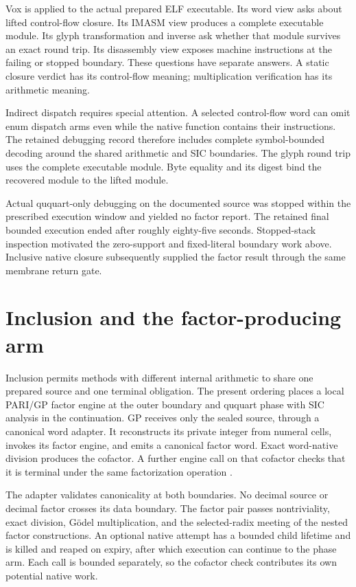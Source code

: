 \documentclass[12pt]{article}
\begin{document}
Vox is applied to the actual prepared ELF executable. Its word view asks about lifted control-flow closure. Its IMASM view produces a complete executable module. Its glyph transformation and inverse ask whether that module survives an exact round trip. Its disassembly view exposes machine instructions at the failing or stopped boundary. These questions have separate answers. A static closure verdict has its control-flow meaning; multiplication verification has its arithmetic meaning.

Indirect dispatch requires special attention. A selected control-flow word can omit enum dispatch arms even while the native function contains their instructions. The retained debugging record therefore includes complete symbol-bounded decoding around the shared arithmetic and SIC boundaries. The glyph round trip uses the complete executable module. Byte equality and its digest bind the recovered module to the lifted module.

Actual ququart-only debugging on the documented source was stopped within the prescribed execution window and yielded no factor report. The retained final bounded execution ended after roughly eighty-five seconds. Stopped-stack inspection motivated the zero-support and fixed-literal boundary work above. Inclusive native closure subsequently supplied the factor result through the same membrane return gate.

\section*{Inclusion and the factor-producing arm}

Inclusion permits methods with different internal arithmetic to share one prepared source and one terminal obligation. The present ordering places a local PARI/GP factor engine at the outer boundary and ququart phase with SIC analysis in the continuation. GP receives only the sealed source, through a canonical word adapter. It reconstructs its private integer from numeral cells, invokes its factor engine, and emits a canonical factor word. Exact word-native division produces the cofactor. A further engine call on that cofactor checks that it is terminal under the same factorization operation \cite{pari}.

The adapter validates canonicality at both boundaries. No decimal source or decimal factor crosses its data boundary. The factor pair passes nontriviality, exact division, G\"odel multiplication, and the selected-radix meeting of the nested factor constructions. An optional native attempt has a bounded child lifetime and is killed and reaped on expiry, after which execution can continue to the phase arm. Each call is bounded separately, so the cofactor check contributes its own potential native work.
\end{document}

